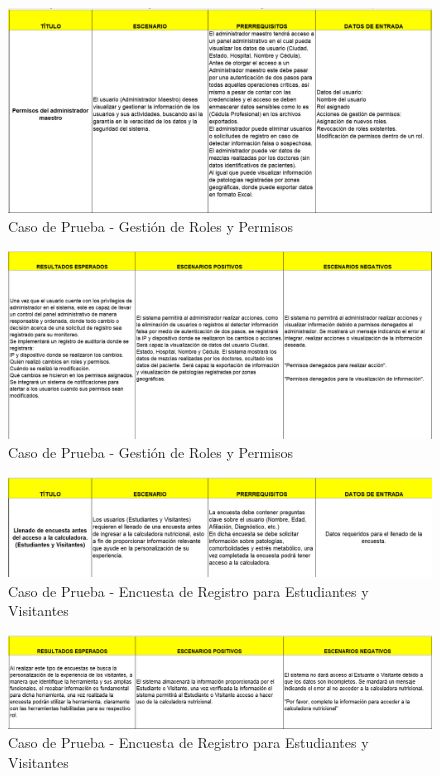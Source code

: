 \documentclass[12pt,letterpaper,spanish, xcolor=table]{report}
\numberwithin{figure}{subsection}
\begin{document}
	
	\begin{figure}[H]
		\centering
		\includegraphics[width=1.0\textwidth]
		{Imagenes/CalculadoraNutricional/CPRolesPermisos.png}
		\caption{Caso de Prueba - Gestión de Roles y Permisos
		}\label{a2}
	\end{figure}
	
	\begin{figure}[H]
		\centering
		\includegraphics[width=1.0\textwidth]
		{Imagenes/CalculadoraNutricional/CPRolesPermisos2.png}
		\caption{Caso de Prueba - Gestión de Roles y Permisos
		}\label{a2}
	\end{figure}
	
	\begin{figure}[H]
		\centering
		\includegraphics[width=1.0\textwidth]
		{Imagenes/CalculadoraNutricional/CPEncuestaEstudiante.png}
		\caption{Caso de Prueba - Encuesta de Registro para Estudiantes y Visitantes
		}\label{a2}
	\end{figure}
	
	\begin{figure}[H]
		\centering
		\includegraphics[width=1.0\textwidth]
		{Imagenes/CalculadoraNutricional/CPEncuestaEstudiante2.png}
		\caption{Caso de Prueba - Encuesta de Registro para Estudiantes y Visitantes
		}\label{a2}
	\end{figure}
\end{document}
